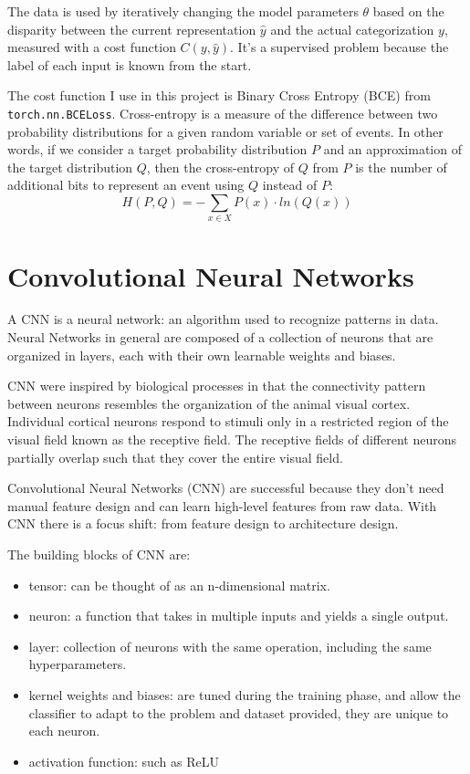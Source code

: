 \documentclass[
  13pt,
  a4paper,
  DIV=11,
  numbers=noendperiod]{scrreprt}
\providecommand{\tightlist}{%
  \setlength{\itemsep}{0pt}\setlength{\parskip}{0pt}}\usepackage{longtable,booktabs,array}
\begin{document}
The data is used by iteratively changing the model parameters \(\theta\)
based on the disparity between the current representation
\(\widehat{y}\) and the actual categorization \(y\), measured with a
cost function \(C(y, \widehat{y})\). It's a supervised problem because
the label of each input is known from the start.

The cost function I use in this project is Binary Cross Entropy (BCE)
from \texttt{torch.nn.BCELoss}. Cross-entropy is a measure of the
difference between two probability distributions for a given random
variable or set of events. In other words, if we consider a target
probability distribution \(P\) and an approximation of the target
distribution \(Q\), then the cross-entropy of \(Q\) from \(P\) is the
number of additional bits to represent an event using \(Q\) instead of
\(P\): \[
H(P,Q) = - \sum_{x \in X} P(x) \cdot ln(Q(x))
\]

\section{Convolutional Neural
Networks}\label{convolutional-neural-networks}

A CNN is a neural network: an algorithm used to recognize patterns in
data. Neural Networks in general are composed of a collection of neurons
that are organized in layers, each with their own learnable weights and
biases.

CNN were inspired by biological processes in that the connectivity
pattern between neurons resembles the organization of the animal visual
cortex. Individual cortical neurons respond to stimuli only in a
restricted region of the visual field known as the receptive field. The
receptive fields of different neurons partially overlap such that they
cover the entire visual field.

Convolutional Neural Networks (CNN) are successful because they don't
need manual feature design and can learn high-level features from raw
data. With CNN there is a focus shift: from feature design to
architecture design.

The building blocks of CNN are:

\begin{itemize}
\tightlist
\item
  tensor: can be thought of as an n-dimensional matrix.
\item
  neuron: a function that takes in multiple inputs and yields a single
  output.
\item
  layer: collection of neurons with the same operation, including the
  same hyperparameters.
\item
  kernel weights and biases: are tuned during the training phase, and
  allow the classifier to adapt to the problem and dataset provided,
  they are unique to each neuron.
\item
  activation function: such as ReLU
\end{itemize}
\end{document}
